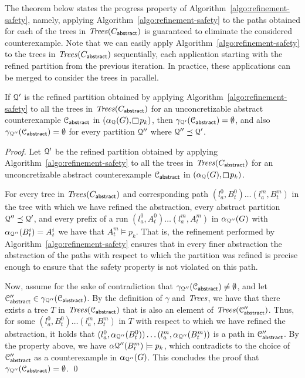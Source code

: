 The theorem below states the progress property  of Algorithm~\ref{algo:refinement-safety}, namely, applying Algorithm~\ref{algo:refinement-safety} to the paths obtained for each of the trees in $\mathit{Trees}(C_{\mathsf{abstract}})$ is guaranteed to eliminate the considered counterexample. Note that we can easily apply Algorithm~\ref{algo:refinement-safety} to the trees in $\mathit{Trees}(C_{\mathsf{abstract}})$ sequentially, each application starting with the refined partition from the previous iteration. In practice, these applications can be merged to consider the trees in parallel.


\begin{thm}If $\mathcal{Q}'$ is the refined partition obtained by applying Algorithm~\ref{algo:refinement-safety} to all the trees in $\mathit{Trees}(C_{\mathsf{abstract}})$ for an unconcretizable abstract counterexample $\mathcal{C}_{\mathsf{abstract}}$ in $(\alpha_\partition(G),\LTLglobally p_k)$, then $\gamma_{\mathcal{Q}'}(\mathcal{C}_{\mathsf{abstract}}) = \emptyset$, and also $\gamma_{\mathcal{Q}''}(\mathcal{C}_{\mathsf{abstract}}) = \emptyset$ for every partition $\mathcal{Q}''$ where $\mathcal{Q}'' \preceq \mathcal{Q}'$.
\end{thm}

\begin{proof}
	Let $\mathcal{Q}'$ be the refined partition obtained by applying Algorithm~\ref{algo:refinement-safety} to all the trees in $\mathit{Trees}(C_{\mathsf{abstract}})$ for an unconcretizable abstract counterexample $\mathcal{C}_{\mathsf{abstract}}$ in $(\alpha_\partition(G),\LTLglobally p_k)$.
	
	For every tree in $\mathit{Trees}(C_{\mathsf{abstract}})$ and corresponding path $(l_a^0,B_t^0)\ldots (l_a^m,B_t^m)$ in the tree with which we have refined the abstraction, every abstract partition $\mathcal{Q}'' \preceq \mathcal{Q}'$, and every prefix of a run $(l_a^0,A_t^0)\ldots (l_a^m,A_t^m)$ in $\alpha_{\mathcal{Q}''}(G)$ with $\alpha_{\mathcal{Q}''}(B_t^i) = A_t^i$ we have that $A_t^m \models p_k$. That is, the refinement performed by Algorithm~\ref{algo:refinement-safety} ensures that in every finer abstraction the abstraction of the paths with respect to which the partition was refined is precise enough to ensure that the safety property is not violated on this path.
	
	Now, assume for the sake of contradiction that $\gamma_{\mathcal{Q}''}(\mathcal{C}_{\mathsf{abstract}}) \neq \emptyset$, and let $\mathcal{C}_{\mathsf{abstract}}'' \in\gamma_{\mathcal{Q}''}(\mathcal{C}_{\mathsf{abstract}})$. By the definition of $\gamma$ and $\mathit{Trees}$, we have that there exists a tree $T$ in $\mathit{Trees}(\mathcal{C}_{\mathsf{abstract}})$ that is also an element of $\mathit{Trees}(\mathcal{C}_{\mathsf{abstract}}'')$. Thus, for some $(l_a^0,B_t^0)\ldots (l_a^m,B_t^m)$ in $T$ with respect to which we have refined the abstraction, it holds that $(l_a^0,\alpha_{\mathcal{Q}''}(B_t^0))\ldots (l_a^m,\alpha_{\mathcal{Q}''}(B_t^m))$ is a path in $\mathcal{C}_{\mathsf{abstract}}''$. By the property above, we have $\alpha{\mathcal{Q}''}(B_t^m)\models p_k$, which contradicts to the choice of $\mathcal{C}_{\mathsf{abstract}}''$ as a counterexample in $\alpha_{\mathcal{Q}''}(G)$. This concludes the proof that $\gamma_{\mathcal{Q}''}(\mathcal{C}_{\mathsf{abstract}}) = \emptyset$.
	\qed
\end{proof}

